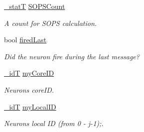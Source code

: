 \begin{DoxyCompactItemize}
\hyperlink{assist_8h_ad77e6fc5a9b03d46e7c97b7c4b92e89f}{\+\_\+stat\+T} \hyperlink{structneuron_state_a71fbb9a79e8048b473b6e09d29a64bbe}{S\+O\+P\+S\+Count}
\begin{DoxyCompactList}\small\item\em A count for S\+O\+P\+S calculation. \end{DoxyCompactList}\item 
bool \hyperlink{structneuron_state_a287eb8703dbfb177165d31c8840646b8}{fired\+Last}
\begin{DoxyCompactList}\small\item\em Did the neuron fire during the last message? \end{DoxyCompactList}\end{DoxyCompactItemize}
{\bf }\par
\begin{DoxyCompactItemize}
\item 
\hyperlink{assist_8h_a3f7a6e6a1210b6d9d7a42177dcb9634b}{\+\_\+id\+T} \hyperlink{structneuron_state_a76ef99e5766b6e36c3f41a2920e8c56c}{my\+Core\+I\+D}
\begin{DoxyCompactList}\small\item\em Neuron\textquotesingle{}s core\+I\+D. \end{DoxyCompactList}\item 
\hyperlink{assist_8h_a3f7a6e6a1210b6d9d7a42177dcb9634b}{\+\_\+id\+T} \hyperlink{structneuron_state_ac24762c24aede292a2ce5df78114881c}{my\+Local\+I\+D}
\begin{DoxyCompactList}\small\item\em Neuron\textquotesingle{}s local I\+D (from 0 -\/ j-\/1);. \end{DoxyCompactList}\end{DoxyCompactItemize}

